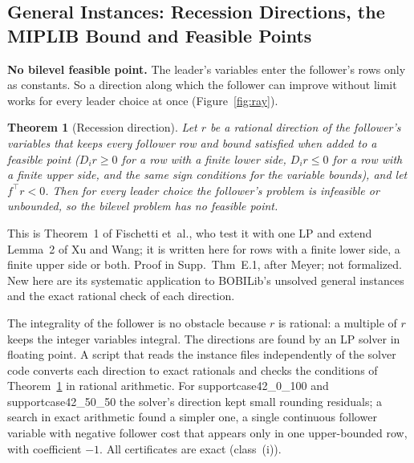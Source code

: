 \documentclass[]{spie}  %
\theoremstyle{plain}
\newtheorem{thm}{Theorem}
\newcommand{\inst}[1]{\mbox{#1}}             %
\newcommand{\T}{^{\top}}
\newcommand{\cls}[1]{class~(#1)}             %
\begin{document}
\subsection{General Instances: Recession Directions, the MIPLIB Bound and Feasible Points}\label{sec:general}

\textbf{No bilevel feasible point.} The leader's variables enter the follower's rows only as
constants. So a direction along which the follower can improve without limit works for every
leader choice at once (Figure~\ref{fig:ray}).

\begin{thm}[Recession direction\cite{xu2014exact,fischetti2018intersection}]\label{thm:ray}
Let $r$ be a rational direction of the follower's variables that keeps every follower row and
bound satisfied when added to a feasible point ($D_ir\ge 0$ for a row with a finite lower side,
$D_ir\le 0$ for a row with a finite upper side, and the same sign conditions for the variable
bounds), and let $f\T r<0$. Then for every leader choice the follower's problem is infeasible or
unbounded, so the bilevel problem has no feasible point.
\end{thm}
\noindent This is Theorem~1 of Fischetti et~al.,\cite{fischetti2018intersection} who test it with
one LP and extend Lemma~2 of Xu and Wang;\cite{xu2014exact} it is written here for rows with a
finite lower side, a finite upper side or both. Proof in Supp.\ Thm~E.1, after Meyer;\cite{meyer1974existence} not
formalized. New here are its systematic application to BOBILib's unsolved general instances and
the exact rational check of each direction.

The integrality of the follower is no obstacle because $r$ is rational: a multiple of $r$ keeps
the integer variables integral. The directions are found by an LP solver in floating point. A
script that reads the instance files independently of the solver code converts each direction
to exact rationals and checks the conditions of Theorem~\ref{thm:ray} in rational arithmetic.
For \inst{supportcase42\_0\_100} and \inst{supportcase42\_50\_50} the solver's direction kept small
rounding residuals; a search in exact arithmetic found a simpler one, a single continuous
follower variable with negative follower cost that appears only in one upper-bounded row, with
coefficient $-1$. All \NumRayExact{} certificates are exact (\cls{i}).
\end{document}

